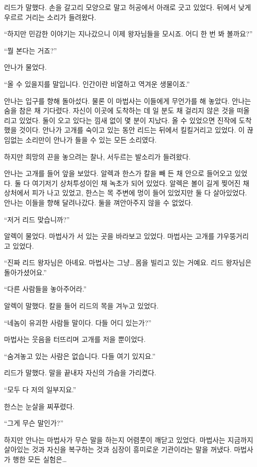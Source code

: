 리드가 말했다. 손을 갈고리 모양으로 말고 허공에서 아래로 긋고 있었다. 뒤에서 낮게 우르르 거리는 소리가 들려왔다.

``하지만 민감한 이야기는 지나갔으니 이제 왕자님들을 모시죠. 어디 한 번 봐 볼까요?''

``뭘 본다는 거죠?''

안나가 물었다.

``올 수 있을지를 말입니다. 인간이란 비열하고 역겨운 생물이죠.''

안나는 입구를 향해 돌아섰다. 물론 이 마법사는 이들에게 무언가를 해 놓았다. 안나는 숨을 참은 채 기다렸다. 자신이 이곳에 도착하는 데 일 분도 채 걸리지 않은 것을 떠올리고 있었다. 둘이 오고 있다는 낌새 없이 몇 분이 지났다. 올 수 있었으면 진작에 도착했을 것이다. 안나가 고개를 숙이고 있는 동안 리드는 뒤에서 킬킬거리고 있었다. 이 끊임없는 소리만이 안나가 들을 수 있는 모든 소리였다.

하지만 희망의 끈을 놓으려는 찰나, 서두르는 발소리가 들려왔다.

안나는 고개를 들어 앞을 보았다. 알렉과 한스가 칼을 빼 든 채 안으로 들어오고 있었다. 둘 다 여기저기 상처투성이인 채 녹초가 되어 있었다. 알렉은 볼이 길게 찢어진 채 상처에서 피가 나고 있었고, 한스는 목 주변에 멍이 들어 있었지만 둘 다 살아있었다. 안나는 이들을 향해 달려나갔다. 둘을 껴안아주지 않을 수 없었다.

``저거 리드 맞습니까?''

알렉이 물었다. 마법사가 서 있는 곳을 바라보고 있었다. 마법사는 고개를 갸우뚱거리고 있었다.

``진짜 리드 왕자님은 아녜요. 마법사는 그냥\ldots\,몸을 빌리고 있는 거예요. 리드 왕자님은 돌아가셨어요.''

``다른 사람들을 놓아주어라.''

알렉이 말했다. 칼을 들어 리드의 목을 겨누고 있었다.

``네놈이 유괴한 사람들 말이다. 다들 어디 있는가?''

마법사는 웃음을 터뜨리며 고개를 저을 뿐이었다.

``숨겨놓고 있는 사람은 없습니다. 다들 여기 있지요.''

리드가 말했다. 말을 끝내자 자신의 가슴을 가리켰다.

``모두 다 저의 일부지요.''

한스는 눈살을 찌푸렸다.

``그게 무슨 말인가?''

하지만 안나는 마법사가 무슨 말을 하는지 어렴풋이 깨닫고 있었다. 마법사는 지금까지 살아있는 것과 자신을 복구하는 것과 심장이 흥미로운 기관이라는 말을 꺼냈다. 마법사가 행한 모든 실험은\ldots

